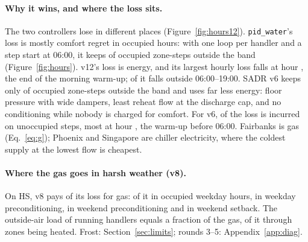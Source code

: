 \documentclass{article}
\begin{document}
\paragraph{Why it wins, and where the loss sits.} The two controllers lose in different places (Figure~\ref{fig:hours12}). \texttt{pid\_water}'s loss is mostly comfort regret in occupied hours: with one loop per handler and a step start at 06:00, it keeps \OccOutPidWater{} of occupied zone-steps outside the band (Figure~\ref{fig:hours}). v12's loss is energy, and its largest hourly loss falls at hour \RElvHourPeak{}, the end of the morning warm-up; \RElvUnoccHourShare{} of it falls outside 06:00--19:00. SADR v6 keeps only \OccOutOurs{} of occupied zone-steps outside the band and uses far less energy: floor pressure with wide dampers, least reheat flow at the discharge cap, and no conditioning while nobody is charged for comfort. For v6, \UnoccShareOurs{} of the loss is incurred on unoccupied steps, most at hour \PeakLossHourOurs{}, the warm-up before 06:00. Fairbanks is gas (Eq.~\ref{eq:g}); Phoenix and Singapore are chiller electricity, where the coldest supply at the lowest flow is cheapest.

\paragraph{Where the gas goes in harsh weather (v8).} On HS, v8 pays \RSixDecGas{} of its loss for gas: \RSixDecOccWd{} of it in occupied weekday hours, \RSixDecPreWd{} in weekday preconditioning, \RSixDecPreWe{} in weekend preconditioning and \RSixDecSbWe{} in weekend setback. The outside-air load of running handlers equals a fraction \RSixDecVent{} of the gas, \RSixDecVentHeated{} of it through zones being heated. Frost: Section~\ref{sec:limits}; rounds 3--5: Appendix~\ref{app:diag}.
\end{document}

